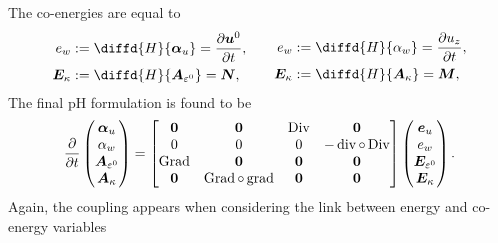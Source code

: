 The co-energies are equal to
\begin{equation}
\begin{aligned}
e_w &:= \diffd{H}{\bm\alpha_u} = \diffp{\bm{u}^0}{t},\\
\bm{E}_{\kappa} &:= \diffd{H}{\bm{A}_{\varepsilon^0}} = \bm{N},\\
\end{aligned} \qquad
\begin{aligned}
e_w &:= \diffd{H}{\alpha_w} = \diffp{u_z}{t}, \\
\bm{E}_{\kappa} &:= \diffd{H}{\bm{A}_{\kappa}} = \bm{M}, \\
\end{aligned} 
\end{equation}
The final pH formulation is found to be
\begin{equation}\label{eq:phsysLamKir}
\diffp{}{t}
\begin{pmatrix}
\bm\alpha_u \\
\alpha_w \\
\bm{A}_{\varepsilon^0} \\
\bm{A}_\kappa \\
\end{pmatrix} = 
\begin{bmatrix}
\bm{0} & \bm{0} &  \Div & \bm{0} \\
0 & 0 & 0 & -\div\circ\Div \\
\Grad & \bm{0} & \bm{0}  & \bm{0} \\
\bm{0} & \Grad\circ\grad & \bm{0} & \bm{0} \\
\end{bmatrix}
\begin{pmatrix}
\bm{e}_u \\
e_w \\
\bm{E}_{\varepsilon^0} \\
\bm{E}_{\kappa} \\
\end{pmatrix}.
\end{equation}
Again, the coupling appears when considering the link between energy and co-energy variables
